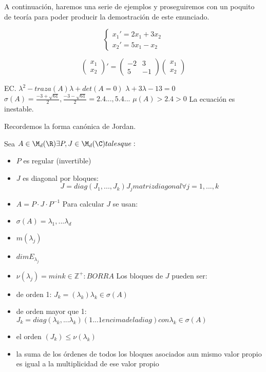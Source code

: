 A continuación, haremos una serie de ejemplos y proseguiremos con un poquito de teoría para poder producir la demostración de este enunciado.\\
\begin{ejemplo}
\begin{equation}
\left\{\begin{array}{lcl}
x_1'=2x_1+3x_2\\
x_2'=5x_1-x_2
\end{array}\right.
\end{equation}

\begin{equation}
\begin{pmatrix}
x_1 \\
x_2
\end{pmatrix}'=
\begin{pmatrix}
-2 & 3\\
5 & -1
\end{pmatrix}
\begin{pmatrix}
x_1 \\
x_2
\end{pmatrix}
\end{equation}


EC. $\lambda^2-traza(A)\lambda + det(A=0)$
$\lambda+3\lambda-13=0$
$\sigma(A)={\frac{-3+\sqrt{61}}{2},\frac{-3-\sqrt{61}}{2}}={2.4...,5.4...}$
$\mu(A)>2.4 >0$
La ecuación es inestable.
\end{ejemplo}


Recordemos la forma canónica de Jordan.

Sea $A \in \M_d(\R) \exists P, J \in \M_d(\C) tales que:$
\begin{itemize}
\item $P$ es regular (invertible)
\item $J$ es diagonal por bloques:
\begin{equation}
J=diag(J_1,...,J_k) J_j matriz diagonal \forall j=1,...,k
\end{equation}
\item $A=P\cdot J\cdot P^{-1}$
Para calcular $J$ se usan:
\item $\sigma(A)={\lambda_1,...\lambda_d}$
\item $m(\lambda_j)$
\item $dim E_{\lambda_j}$
\item $\nu(\lambda_j)=min{k\in\mathbb{Z}^+: BORRA}$
Los bloques de $J$ pueden ser:
\item de orden 1: $J_k=(\lambda_k) \lambda_k \in \sigma(A)$
\item de orden mayor que 1: $J_k=diag(\lambda_k,...\lambda_k) (1...1 encima de la diag) con \lambda_k \in \sigma(A)$
\item el orden $(J_k) \leq \nu(\lambda_k)$
\item la suma de los órdenes de todos los bloques asociados aun mismo valor propio es igual a la multiplicidad de ese valor propio
\end{itemize}

